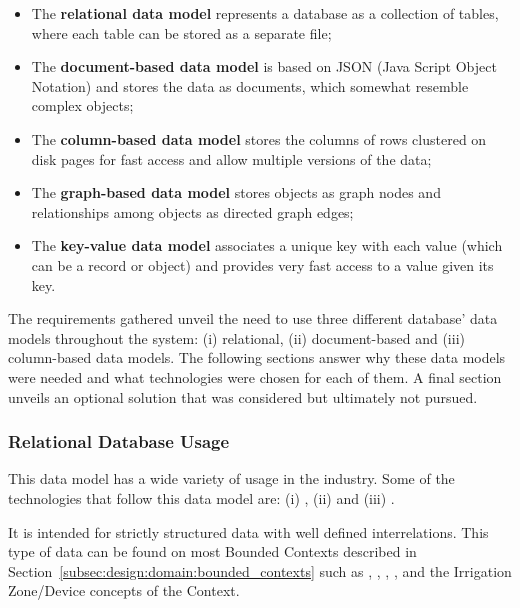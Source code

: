 \begin{itemize}
    \item The \textbf{relational data model} represents a database as a collection of tables,
    where each table can be stored as a separate file; 
    \item The \textbf{document-based data model} is based on JSON (Java Script
    Object Notation) and stores the data as documents, which somewhat resemble
    complex objects; 
    \item The \textbf{column-based data model} stores the columns of rows clustered on disk pages for fast access and allow multiple versions of the data;
    \item The \textbf{graph-based data model} stores objects as graph nodes and relationships among objects as directed graph edges;
    \item The \textbf{key-value data model} associates a unique key with each value (which can be a record or object) and provides very fast access to a value given its key.
\end{itemize}

The requirements gathered unveil the need to use three different database' data models throughout the system: (i) relational, (ii) document-based and (iii) column-based data models. The following sections answer why these data models were needed and what technologies were chosen for each of them. A final section unveils an optional solution that was considered but ultimately not pursued.

\subsubsection*{Relational Database Usage}
\label{subsubsec:implementation:decisions:database:relational}

This data model has a wide variety of usage in the industry. Some of the technologies that follow this data model are: (i) , (ii)  and (iii) .

It is intended for strictly structured data with well defined interrelations. This type of data can be found on most Bounded Contexts described in Section~\ref{subsec:design:domain:bounded_contexts} such as , , , ,  and the Irrigation Zone/Device concepts of the  Context.

